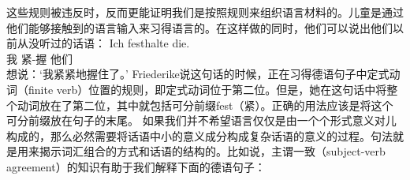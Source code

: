 这些规则被违反时，反而更能证明我们是按照规则来组织语言材料的。儿童是通过他们能够接触到的语言输入来习得语言的。在这样做的同时，他们可以说出他们以前从没听过的话语：
\ea
\settowidth{}
\gll Ich festhalte die. \\
     我 紧-握 他们\\
\glt 想说：`我紧紧地握住了。'
\z
Friederike说这句话的时候，正在习得德语句子中定式动词（finite verb）位置的规则，即定式动词位于第二位。但是，她在这句话中将整个动词放在了第二位，其中就包括可分前缀fest（紧）。正确的用法应该是将这个可分前缀放在句子的末尾。
如果我们并不希望语言仅仅是由一个个形式意义对儿构成的，那么必然需要将话语中小的意义成分构成复杂话语的意义的过程。句法就是用来揭示词汇组合的方式和话语的结构的。比如说，主谓一致（subject-verb agreement）的知识有助于我们解释下面的德语句子：

